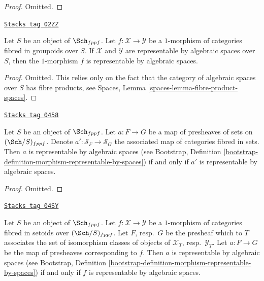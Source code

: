 \begin{proof}
Omitted.
\end{proof}

\begin{lemma}
\label{algebraic-lemma-morphism-spaces-gives-representable-by-spaces}
\href{https://stacks.math.columbia.edu/tag/02ZZ}{\texttt{Stacks tag 02ZZ}}

Let $S$ be an object of $\Sch_{fppf}$.
Let $f : \mathcal{X} \to \mathcal{Y}$
be a $1$-morphism of categories fibred in groupoids over $S$.
If $\mathcal{X}$ and $\mathcal{Y}$ are representable by
algebraic spaces over $S$, then the $1$-morphism $f$
is representable by algebraic spaces.
\end{lemma}

\begin{proof}
Omitted. This relies only on the fact that
the category of algebraic spaces over $S$ has fibre products,
see Spaces, Lemma \ref{spaces-lemma-fibre-product-spaces}.
\end{proof}

\begin{lemma}
\label{algebraic-lemma-map-presheaves-representable-by-algebraic-spaces}
\href{https://stacks.math.columbia.edu/tag/0458}{\texttt{Stacks tag 0458}}

Let $S$ be an object of $\Sch_{fppf}$.
Let $a : F \to G$ be a map of presheaves of sets on $(\Sch/S)_{fppf}$.
Denote $a' : \mathcal{S}_F  \to \mathcal{S}_G$ the associated
map of categories fibred in sets.
Then $a$ is representable by algebraic spaces (see
Bootstrap,
Definition \ref{bootstrap-definition-morphism-representable-by-spaces})
if and only if $a'$ is representable by algebraic spaces.
\end{lemma}

\begin{proof}
Omitted.
\end{proof}

\begin{lemma}
\label{algebraic-lemma-map-fibred-setoids-representable-algebraic-spaces}
\href{https://stacks.math.columbia.edu/tag/04SY}{\texttt{Stacks tag 04SY}}

Let $S$ be an object of $\Sch_{fppf}$.
Let $f : \mathcal{X} \to \mathcal{Y}$ be a $1$-morphism of
categories fibred in setoids over $(\Sch/S)_{fppf}$.
Let $F$, resp.\ $G$ be the presheaf which to $T$ associates
the set of isomorphism classes of objects of
$\mathcal{X}_T$, resp.\ $\mathcal{Y}_T$.
Let $a : F \to G$ be the map of presheaves corresponding to $f$.
Then $a$ is representable by algebraic spaces (see
Bootstrap,
Definition \ref{bootstrap-definition-morphism-representable-by-spaces})
if and only if $f$ is representable by algebraic spaces.
\end{lemma}

